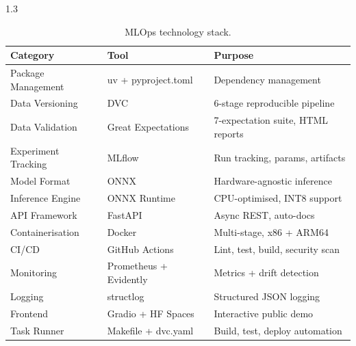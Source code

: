 \begin{spacing}{1.3}
\begin{table}[H]
\centering
\caption{MLOps technology stack.}
\label{tab:stack}
\begin{tabular}{lll}
\toprule
\textbf{Category} & \textbf{Tool} & \textbf{Purpose} \\
\midrule
Package Management & uv + pyproject.toml & Dependency management \\
Data Versioning & DVC & 6-stage reproducible pipeline \\
Data Validation & Great Expectations & 7-expectation suite, HTML reports \\
Experiment Tracking & MLflow & Run tracking, params, artifacts \\
Model Format & ONNX & Hardware-agnostic inference \\
Inference Engine & ONNX Runtime & CPU-optimised, INT8 support \\
API Framework & FastAPI & Async REST, auto-docs \\
Containerisation & Docker & Multi-stage, x86 + ARM64 \\
CI/CD & GitHub Actions & Lint, test, build, security scan \\
Monitoring & Prometheus + Evidently & Metrics + drift detection \\
Logging & structlog & Structured JSON logging \\
Frontend & Gradio + HF Spaces & Interactive public demo \\
Task Runner & Makefile + dvc.yaml & Build, test, deploy automation \\
\bottomrule
\end{tabular}
\end{table}

\end{spacing}
